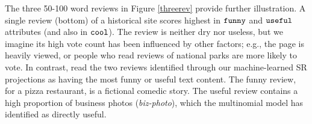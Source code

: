 \documentclass[12pt]{article}
\begin{document}
The three 50-100 word reviews in Figure \ref{threerev} provide further
illustration.  A single review (bottom) of a historical site scores highest in
${\tt funny}$ and ${\tt useful}$  attributes (and also in ${\tt cool}$). The
review is neither dry nor useless, but we imagine its high vote count has been
influenced by other factors; e.g., the page is heavily viewed, or
people who read reviews of national parks are more likely to vote. In
contrast, read the two reviews identified through our machine-learned SR
projections as having the most funny or useful text content.  The funny
review, for a pizza restaurant, is a fictional comedic story. The useful
review contains a high proportion of business photos ({\it biz-photo}), which
the multinomial model has identified as directly useful.
\end{document}
